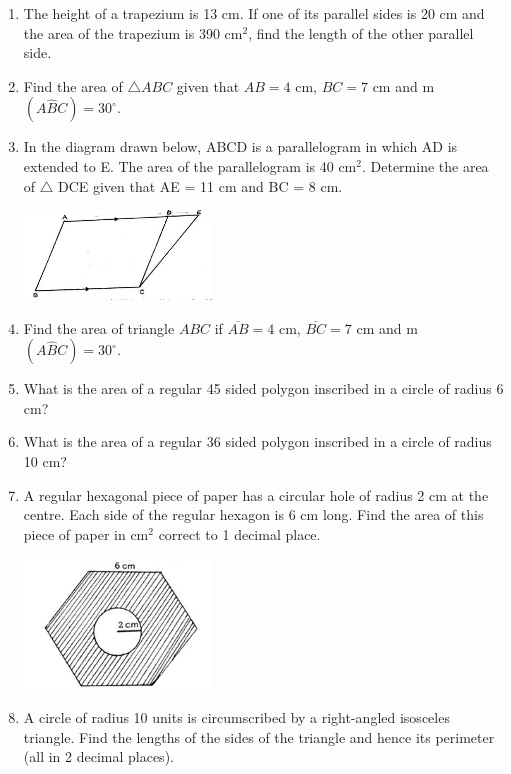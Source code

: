 \begin{enumerate}
	\item The height of a trapezium is 13 cm. If one of its parallel sides is 20 cm and the area of the trapezium is 390 cm$^2$, find the length of the other parallel side.
	
	\item Find the area of $\bigtriangleup ABC$ given that $AB = 4$ cm, $BC = 7$ cm and m$(A\hat{B}C) = 30^\circ$.
	
	\item In the diagram drawn below, ABCD is a parallelogram in which AD is extended to E. The area of the parallelogram is 40 cm$^2$. Determine the area of $\bigtriangleup$ DCE given that AE = 11 cm and BC = 8 cm.
	\begin{center}
	\includegraphics[width=5cm]{./img/ap3.jpg}
	\end{center}
	
	\item Find the area of triangle $ABC$ if $\overline{AB} = 4$ cm, $\overline{BC} = 7$ cm and m$(A\hat{B}C) = 30^\circ$.
	
	\item What is the area of a regular 45 sided polygon inscribed in a circle of radius 6 cm?

	\item What is the area of a regular 36 sided polygon inscribed in a circle of radius 10 cm?
	
	\item A regular hexagonal piece of paper has a circular hole of radius 2 cm at the centre. Each side of the regular hexagon is 6 cm long. Find the area of this piece of paper in cm$^2$ correct to 1 decimal place.
	\begin{center}
	\includegraphics[width=5cm]{./img/ap4.jpg}
	\end{center}

	\item A circle of radius 10 units is circumscribed by a right-angled isosceles triangle. Find the lengths of the sides of the triangle and hence its perimeter (all in 2 decimal places).

\end{enumerate}	
	
